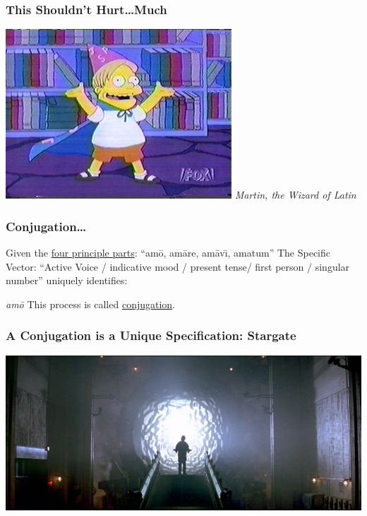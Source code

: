 \documentclass[slidestop,compress,mathserif]{beamer}
\begin{document}
\begin{frame}
	\frametitle{This Shouldn't Hurt{\ldots}Much}
	\begin{center}
		\includegraphics[scale=0.45]{img/MartinWizard.jpg}
		\vskip 0.5cm
		\emph{Martin, the Wizard of Latin}
	\end{center}			
\end{frame}

\begin{frame}
	\frametitle{Conjugation\ldots}
	Given the \underline{four principle parts}:  ``am\={o}, am\={a}re, am\={a}v\={\i}, amatum''
	\vskip 0.5cm
	The Specific Vector: ``Active Voice / indicative mood / present tense/ first person / singular number'' uniquely identifies:
	\vskip 0.5cm
	\begin{center}
		\emph{am\={o}}
		\vskip 0.5cm
		This process is called \underline{conjugation}.
	\end{center}
\end{frame}

\begin{frame}
	\frametitle{A Conjugation is a Unique Specification:  Stargate}
	\begin{center}
		\includegraphics[scale=0.25]{img/stargate.jpg}
		\vskip 0.5cm
	\end{center}
\end{frame}
\end{document}
